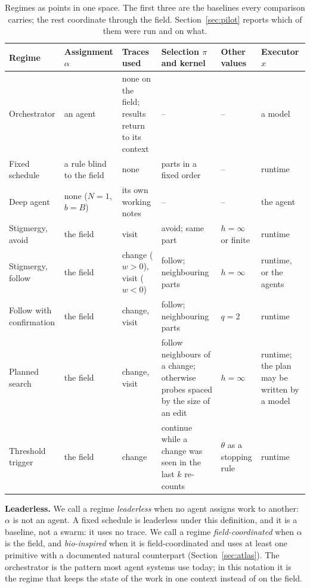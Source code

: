 \documentclass[10pt,twocolumn]{article}
\begin{document}
\begin{table}[t]
\centering\small
\begin{tabularx}{\textwidth}{@{}>{\raggedright\arraybackslash}p{2.9cm} >{\raggedright\arraybackslash}p{2.2cm} >{\raggedright\arraybackslash}p{2.3cm} Y >{\raggedright\arraybackslash}p{1.6cm} >{\raggedright\arraybackslash}p{2.6cm}@{}}
\toprule
Regime & Assignment $\alpha$ & Traces used & Selection $\pi$ and kernel & Other values & Executor $x$ \\
\midrule
Orchestrator & an agent & none on the field; results return to its context & -- & -- & a model \\
Fixed schedule & a rule blind to the field & none & parts in a fixed order & -- & runtime \\
Deep agent & none ($N=1$, $b=B$) & its own working notes & -- & -- & the agent \\
\midrule
Stigmergy, avoid & the field & visit & avoid; same part & $h=\infty$ or finite & runtime \\
Stigmergy, follow & the field & change ($w>0$), visit ($w<0$) & follow; neighbouring parts & $h=\infty$ & runtime, or the agents \\
Follow with confirmation & the field & change, visit & follow; neighbouring parts & $q=2$ & runtime \\
Planned search & the field & change, visit & follow neighbours of a change; otherwise probes spaced by the size of an edit & $h=\infty$ & runtime; the plan may be written by a model \\
Threshold trigger & the field & change & continue while a change was seen in the last $k$ re-counts & $\theta$ as a stopping rule & runtime \\
\bottomrule
\end{tabularx}
\caption{Regimes as points in one space. The first three are the baselines every comparison carries; the rest coordinate through the field. Section~\ref{sec:pilot} reports which of them were run and on what.}
\label{tab:regimes}
\end{table}

\textbf{Leaderless.} We call a regime \emph{leaderless} when no agent assigns work to another: $\alpha$ is not an agent. A fixed schedule is leaderless under this definition, and it is a baseline, not a swarm: it uses no trace. We call a regime \emph{field-coordinated} when $\alpha$ is the field, and \emph{bio-inspired} when it is field-coordinated and uses at least one primitive with a documented natural counterpart (Section~\ref{sec:atlas}). The orchestrator is the pattern most agent systems use today; in this notation it is the regime that keeps the state of the work in one context instead of on the field.
\end{document}
